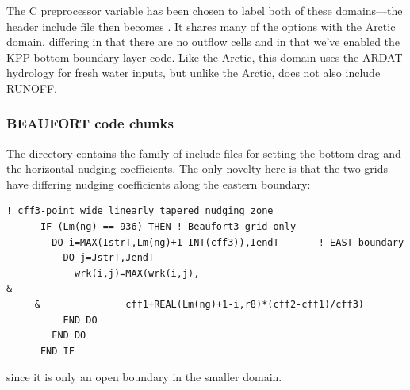 \subsubsection{}
The C preprocessor variable  has been chosen to label
both of these domains---the header include file then becomes
.  It shares many of the options with the Arctic
domain, differing in that there are no outflow cells and in that
we've enabled the KPP bottom boundary layer code. Like the Arctic,
this domain uses the ARDAT hydrology for fresh water inputs, but
unlike the Arctic, does not also include RUNOFF.

\subsubsection{BEAUFORT code chunks}
The  directory contains the  family
of include files for setting the bottom drag and the horizontal
nudging coefficients. The only novelty here is that the two grids
have differing nudging coefficients along the eastern boundary:
\begin{verbatim}
! cff3-point wide linearly tapered nudging zone
      IF (Lm(ng) == 936) THEN ! Beaufort3 grid only
        DO i=MAX(IstrT,Lm(ng)+1-INT(cff3)),IendT       ! EAST boundary
          DO j=JstrT,JendT
            wrk(i,j)=MAX(wrk(i,j),                                      &   
     &               cff1+REAL(Lm(ng)+1-i,r8)*(cff2-cff1)/cff3)
          END DO
        END DO
      END IF
\end{verbatim}
since it is only an open boundary in the smaller domain.

